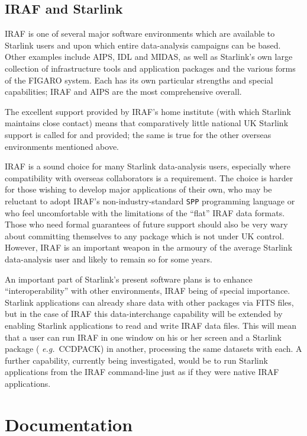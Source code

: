 \subsection{IRAF and Starlink}

IRAF is one of several major software environments which are available
to Starlink users and upon which entire data-analysis campaigns can be
based.  Other examples include AIPS, IDL and MIDAS, as well as
Starlink's own large collection of infrastructure tools and application
packages and the various forms of the FIGARO system.  Each has its own
particular strengths and special capabilities;  IRAF and AIPS are the
most comprehensive overall.

The excellent support provided by IRAF's home institute (with which
Starlink maintains close contact) means that comparatively little
national UK Starlink support is called for and provided;  the same is
true for the other overseas environments mentioned above.

IRAF is a sound choice for many Starlink data-analysis users,
especially where compatibility with overseas collaborators is a
requirement.  The choice is harder for those wishing to develop major
applications of their own, who may be reluctant to adopt IRAF's
non-industry-standard \verb|SPP| programming language or who feel
uncomfortable with the limitations of the ``flat'' IRAF data formats.
Those who need formal guarantees of future support should also be very
wary about committing themselves to any package which is not under UK
control.  However, IRAF is an important weapon in the armoury of the
average Starlink data-analysis user and likely to remain so for some
years.

An important part of Starlink's present software plans is to enhance
``interoperability'' with other environments, IRAF being of special
importance.  Starlink applications can already share data with other
packages via FITS files, but in the case of IRAF this data-interchange
capability will be extended by enabling Starlink applications to read
and write IRAF data files.  This will mean that a user can run IRAF in
one window on his or her screen and a Starlink package ({\it
e.g.}\ CCDPACK) in another, processing the same datasets with each.  A
further capability, currently being investigated, would be to run
Starlink applications from the IRAF command-line just as if they were
native IRAF applications.

\section{Documentation}

